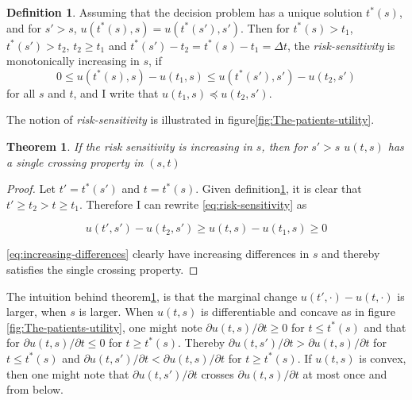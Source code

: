 \documentclass[10pt,a4paper]{article} %
\newtheorem{thm}{Theorem}[section]
\theoremstyle{definition}
\newtheorem{defn}{Definition}[section]
\theoremstyle{remark}
\begin{document}
\begin{defn}
\label{def:risk-sensitivity} 
Assuming that the decision problem has a unique solution $t^{*}(s)$, and for $s'>s$, $u(t^{*}(s),s)=u(t^{*}(s'),s')$. Then for $t^{*}(s)>t_{1}$, $t^{*}(s')>t_{2}$, $t_{2}\ge t_{1}$ and $t^{*}(s')-t_{2}=t^{*}(s)-t_{1}=\Delta t$, the \emph{risk-sensitivity} is monotonically increasing in $s$, if
\begin{equation}
0\le u(t^{*}(s),s)-u(t_{1},s)\le u(t^{*}(s'),s')-u(t_{2},s')\label{eq:risk-sensitivity}
\end{equation}
for all $s$ and $t$, and I write that $u(t_{1},s)\preceq u(t_{2},s')$.
\end{defn}

The notion of \emph{risk-sensitivity} is illustrated in figure\ref{fig:The-patients-utility}.

\begin{thm}
\label{thm:single-crossing} 
If the risk sensitivity is increasing in $s$, then for $s'>s$ $u(t,s)$ has a single crossing property in $(s,t)$
\end{thm}

\begin{proof}
Let $t'=t^{*}(s')$ and $t=t^{*}(s)$. Given definition\ref{def:risk-sensitivity}, it is clear that $t'\ge t_{2}>t\ge t_{1}$. Therefore I can rewrite
\eqref{eq:risk-sensitivity} as

\begin{equation}
u(t',s')-u(t_{2},s')\ge u(t,s)-u(t_{1},s)\ge0\label{eq:increasing-differences}
\end{equation}

\eqref{eq:increasing-differences} clearly have increasing differences in $s$ and thereby satisfies the single crossing property.
\end{proof}

The intuition behind theorem\ref{thm:single-crossing}, is that the marginal change $u(t',\cdot)-u(t,\cdot)$ is larger, when $s$ is larger. When $u(t,s)$ is differentiable and concave as in figure \ref{fig:The-patients-utility}, one might note $\partial u(t,s)/\partial t\ge0$ for $t\le t^{*}(s)$ and that for $\partial u(t,s)/\partial t\le0$ for $t\ge t^{*}(s)$. Thereby $\partial u(t,s')/\partial t>\partial u(t,s)/\partial t$ for $t\le t^{*}(s)$ and $\partial u(t,s')/\partial t<\partial u(t,s)/\partial t$ for $t\ge t^{*}(s)$. If $u(t,s)$ is convex, then one might note that $\partial u(t,s')/\partial t$ crosses $\partial u(t,s)/\partial t$ at most once and from below.
\end{document}
